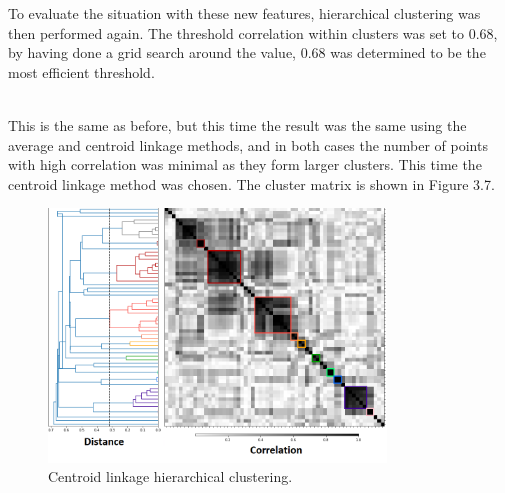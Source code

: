  To evaluate the situation with these new features, hierarchical clustering was then performed again. The threshold correlation within clusters was set to 0.68, by having done a grid search around the value, 0.68 was determined to be the most efficient threshold. \\\\
 
\begin{table}[h]
\caption{Models and correlations.}
\end{table}


This is the same as before, but this time the result was the same using the average and centroid linkage methods, and in both cases the number of points with high correlation was minimal as they form larger clusters. This time the centroid linkage method was chosen. The cluster matrix is shown in Figure 3.7. \\

\begin{figure}[h!]
    \centering
    \includegraphics[width=0.8\textwidth]{Images/Results/Feature Analysis/centroid.png}
    \caption{Centroid linkage hierarchical clustering.}
\end{figure}




